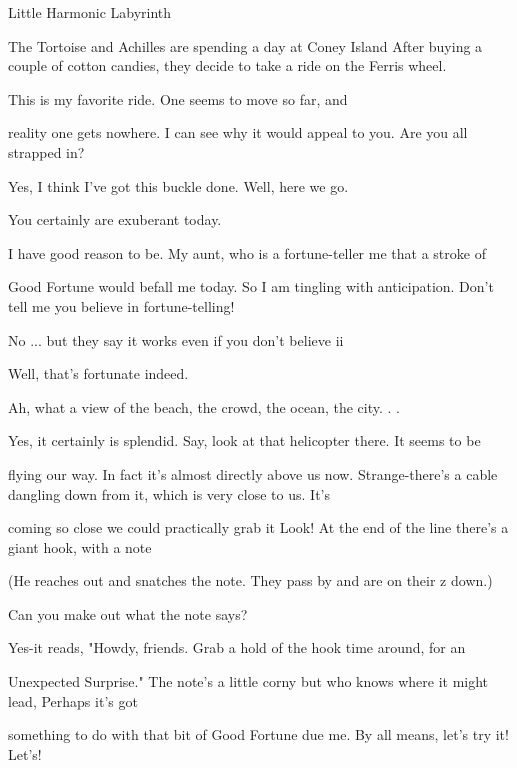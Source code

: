 Little Harmonic Labyrinth 

The Tortoise and Achilles are spending a day at Coney Island After buying a couple of cotton candies, they decide to take a ride on the Ferris wheel. 


\tortoise This is my favorite ride. One seems to move so far, and\par
reality one gets nowhere. 
\achilles I can see why it would appeal to you. Are you all strapped in?\par

\tortoise Yes, I think I've got this buckle done. Well, here we go.\par

\achilles You certainly are exuberant today.\par

\tortoise I have good reason to be. My aunt, who is a fortune-teller me that a stroke of\par
Good Fortune would befall me today. So I am tingling with anticipation. 
\achilles Don't tell me you believe in fortune-telling!\par

\tortoise No ... but they say it works even if you don't believe ii\par

\achilles Well, that's fortunate indeed.\par

\tortoise Ah, what a view of the beach, the crowd, the ocean, the city. . .\par

\achilles Yes, it certainly is splendid. Say, look at that helicopter there. It seems to be\par
flying our way. In fact it's almost directly above us now. 
\tortoise Strange-there's a cable dangling down from it, which is very close to us. It's\par
coming so close we could practically grab it 
\achilles Look! At the end of the line there's a giant hook, with a note\par



\intro (He reaches out and snatches the note. They pass by and are on their z down.) \endintro



\tortoise Can you make out what the note says?\par

\achilles Yes-it reads, "Howdy, friends. Grab a hold of the hook time around, for an\par
Unexpected Surprise." 
\tortoise The note's a little corny but who knows where it might lead, Perhaps it's got\par
something to do with that bit of Good Fortune due me. By all means, let's try it! 
\achilles Let's!\par


